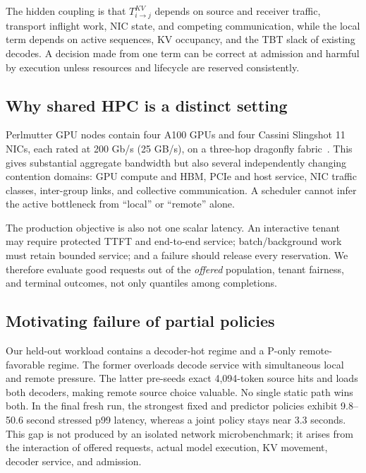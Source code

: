 \documentclass[10pt,twocolumn]{article}
\begin{document}
The hidden coupling is that $T_{i\rightarrow j}^{KV}$ depends on source and
receiver traffic, transport inflight work, NIC state, and competing
communication, while the local term depends on active sequences, KV occupancy,
and the TBT slack of existing decodes.  A decision made from one term can be
correct at admission and harmful by execution unless resources and lifecycle
are reserved consistently.

\subsection{Why shared HPC is a distinct setting}

Perlmutter GPU nodes contain four A100 GPUs and four Cassini Slingshot 11 NICs,
each rated at 200 Gb/s (25 GB/s), on a three-hop dragonfly
fabric~\cite{perlmutter,nerscnetwork}.  This gives substantial aggregate
bandwidth but also several independently changing contention domains: GPU
compute and HBM, PCIe and host service, NIC traffic classes, inter-group links,
and collective communication.  A scheduler cannot infer the active bottleneck
from ``local'' or ``remote'' alone.

The production objective is also not one scalar latency.  An interactive
tenant may require protected TTFT and end-to-end service; batch/background work
must retain bounded service; and a failure should release every reservation.
We therefore evaluate good requests out of the \emph{offered} population,
tenant fairness, and terminal outcomes, not only quantiles among completions.

\subsection{Motivating failure of partial policies}

Our held-out workload contains a decoder-hot regime and a P-only
remote-favorable regime.  The former overloads decode service with simultaneous
local and remote pressure.  The latter pre-seeds exact 4,094-token source hits
and loads both decoders, making remote source choice valuable.  No single
static path wins both.  In the final fresh run, the strongest fixed and
predictor policies exhibit 9.8--50.6 second stressed p99 latency, whereas a
joint policy stays near 3.3 seconds.  This gap is not produced by an isolated
network microbenchmark; it arises from the interaction of offered requests,
actual model execution, KV movement, decoder service, and admission.
\end{document}
